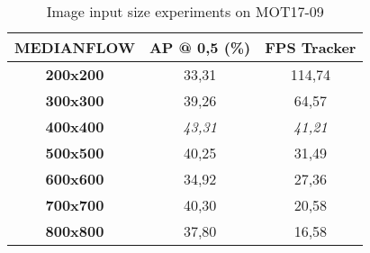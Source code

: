 \appendix 
{}
\newpage
\begin{table}[H]
\begin{center}
\begin{tabular}{|c|c|c|}
\hline
\textbf{MEDIANFLOW} & \textbf{AP @ 0,5 (\%)} & \textbf{FPS Tracker} \\ \hline
\textbf{200x200}    & 33,31                  & 114,74               \\ \hline
\textbf{300x300}    & 39,26                  & 64,57                \\ \hline
\textbf{400x400}    & \textit{43,31}         & \textit{41,21}       \\ \hline
\textbf{500x500}    & 40,25                  & 31,49                \\ \hline
\textbf{600x600}    & 34,92                  & 27,36                \\ \hline
\textbf{700x700}    & 40,30                  & 20,58                \\ \hline
\textbf{800x800}    & 37,80                  & 16,58                \\ \hline
\end{tabular}
\end{center}
\caption{Image input size experiments on MOT17-09}
\label{tab:annex_1}
\end{table}

